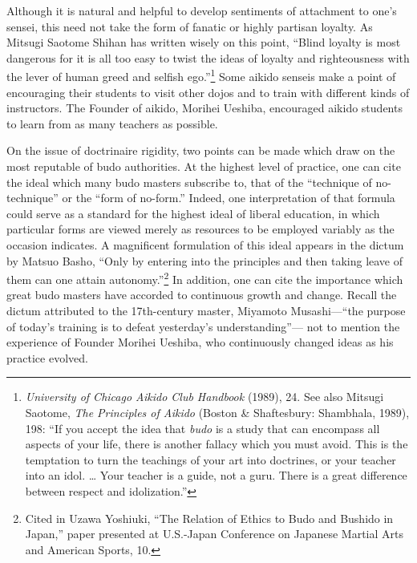 Although it is natural and helpful to develop sentiments of attachment to one's sensei, this need not take the form of fanatic or highly partisan loyalty. As Mitsugi Saotome Shihan has written wisely on this point, ``Blind loyalty is most dangerous for it is all too easy to twist the ideas of loyalty and righteousness with the lever of human greed and selfish ego.''\footnote{\emph{University of Chicago Aikido Club Handbook} (1989), 24. See also Mitsugi Saotome, \emph{The Principles of Aikido} (Boston \& Shaftesbury: Shambhala, 1989), 198: ``If you accept the idea that \emph{budo} is a study that can encompass all aspects of your life, there is another fallacy which you must avoid. This is the temptation to turn the teachings of your art into doctrines, or your teacher into an idol. \ldots{} Your teacher is a guide, not a guru. There is a great difference between respect and idolization.''} Some aikido senseis make a point of encouraging their students to visit other dojos and to train with different kinds of instructors. The Founder of aikido, Morihei Ueshiba, encouraged aikido students to learn from as many teachers as possible. 

On the issue of doctrinaire rigidity, two points can be made which draw on the most reputable of budo authorities. At the highest level of practice, one can cite the ideal which many budo masters subscribe to, that of the ``technique of no-technique'' or the ``form of no-form.'' Indeed, one interpretation of that formula could serve as a standard for the highest ideal of liberal education, in which particular forms are viewed merely as resources to be employed variably as the occasion indicates. A magnificent formulation of this ideal appears in the dictum by Matsuo Basho, ``Only by entering into the principles and then taking leave of them can one attain autonomy.''\footnote{Cited in Uzawa Yoshiuki, ``The Relation of Ethics to Budo and Bushido in Japan,'' paper presented at U.S.-Japan Conference on Japanese Martial Arts and American Sports, 10.} In addition, one can cite the importance which great budo masters have accorded to continuous growth and change. Recall the dictum attributed to the 17th-century master, Miyamoto Musashi---``the purpose of today's training is to defeat yesterday's understanding''--- not to mention the experience of Founder Morihei Ueshiba, who continuously changed ideas as his practice evolved. 

